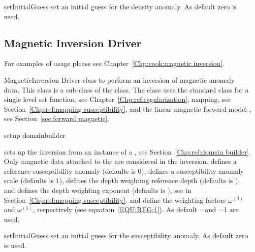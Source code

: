 \begin{methoddesc}[GravityInversion]{setInitialGuess}{}
set an initial guess for the density anomaly. As default zero is used.
\end{methoddesc}

\subsection{Magnetic Inversion Driver}
For examples of usage please see Chapter~\ref{Chp:cook:magnetic inversion}.


\begin{classdesc}{MagneticInversion}{}
Driver class to perform an inversion of magnetic anomaly data. This class
is a sub-class of the  class. The class uses the standard
 class for a single level set function, see Chapter~\ref{Chp:ref:regularization},
 mapping, see Section~\ref{Chp:ref:mapping susceptibility}, and the linear
magnetic forward model , see Section~\ref{sec:forward magnetic}.
\end{classdesc}


\begin{methoddesc}[MagneticInversion]{setup}{
domainbuilder
}

sets up the inversion from an instance  of a , see Section~\ref{Chp:ref:domain builder}.
Only magnetic data attached to the  are considered in the inversion.
 defines a reference susceptibility anomaly (defaults is 0), 
 defines a susceptibility anomaly scale (defaults is $1$),
 defines the depth weighting reference depth (defaults is \None), and
 defines the depth weighting exponent (defaults is \None),
see  in Section~\ref{Chp:ref:mapping susceptibility}.
 and  define the weighting factors
$\omega^{(0)}$ and
$\omega^{(1)}$, respectively (see equation~\ref{EQU:REG:1}).
As default =\None and =1 are used.
\end{methoddesc}

\begin{methoddesc}[MagneticInversion]{setInitialGuess}{}
set an initial guess for the susceptibility anomaly. As default zero is used.
\end{methoddesc}

